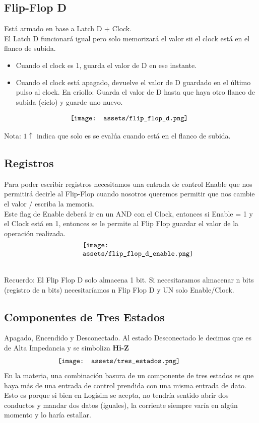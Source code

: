 \documentclass[10pt,a4paper]{article}
\begin{document}
\subsection*{Flip-Flop D}
Está armado en base a Latch D + Clock. \\
El Latch D funcionará igual pero solo memorizará el valor sii el clock está en el flanco de subida.
\begin{itemize}
    \item Cuando el clock es 1, guarda el valor de D en ese instante.
    \item Cuando el clock está apagado, devuelve el valor de D guardado en el último pulso al clock. En criollo: Guarda el valor de D hasta que haya otro flanco de subida (ciclo) y guarde uno nuevo.
\end{itemize}

\[\begin{minipage}[b]{0.5\textwidth}
    \texttt{[image: assets/flip\_flop\_d.png]}
    \label{fig:flip_flop_d}
\end{minipage}\]

Nota: \(1\uparrow\) indica que solo es se evalúa cuando está en el flanco de subida.
\subsection*{Registros}
Para poder escribir registros necesitamos una entrada de control Enable que nos permitirá decirle al Flip-Flop cuando nosotros queremos permitir que nos cambie el valor / escriba la memoria. \\
Este flag de Enable deberá ir en un AND con el Clock, entonces si Enable = 1 y el Clock está en 1, entonces se le permite al Flip Flop guardar el valor de la operación realizada.
\[\begin{minipage}[b]{0.4\textwidth}
    \texttt{[image: assets/flip\_flop\_d\_enable.png]}
    \label{fig:flip_flop_d_enable}
\end{minipage}\]

Recuerdo: El Flip Flop D solo almacena 1 bit. Si necesitaramos almacenar n bits (registro de n bits) necesitaríamos n Flip Flop D y UN solo Enable/Clock.

\subsection*{Componentes de Tres Estados}
Apagado, Encendido y Desconectado.
Al estado Desconectado le decimos que es de Alta Impedancia y se simboliza \textbf{Hi-Z}
\[\begin{minipage}[b]{0.6\textwidth}
    \texttt{[image: assets/tres\_estados.png]}
    \label{fig:tres_estados}
\end{minipage}\]
En la materia, una combinación basura de un componente de tres estados es que haya más de una entrada de control prendida con una misma entrada de dato. Esto es porque si bien en Logisim se acepta, no tendría sentido abrir dos conductos y mandar dos datos (iguales), la corriente siempre varía en algún momento y lo haría estallar. \\
\end{document}
